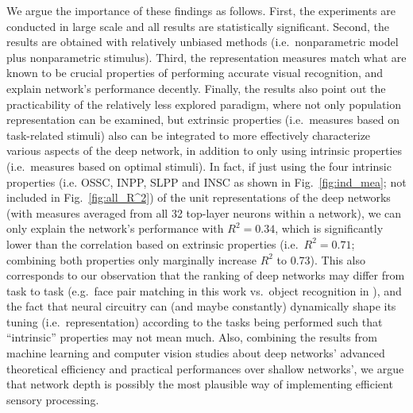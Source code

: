 We argue the importance of these findings as follows. First, the experiments are conducted in large scale and all results are statistically significant. Second, the results are obtained with relatively unbiased methods (i.e.~nonparametric model plus nonparametric stimulus). Third, the representation measures match what are known to be crucial properties of performing accurate visual recognition, and explain network's performance decently. Finally, the results also point out the practicability of the relatively less explored paradigm, where not only population representation can be examined, but extrinsic properties (i.e.~measures based on task-related stimuli) also can be integrated to more effectively characterize various aspects of the deep network, in addition to only using intrinsic properties (i.e.~measures based on optimal stimuli). In fact, if just using the four intrinsic properties (i.e. OSSC, INPP, SLPP and INSC as shown in Fig.~\ref{fig:ind_mea}; not included in Fig.~\ref{fig:all_R^2}) of the unit representations of the deep networks (with measures averaged from all 32 top-layer neurons within a network), we can only explain the network's performance with $R^2 = 0.34$, which is significantly lower than the correlation based on extrinsic properties (i.e.~$R^2 = 0.71$; combining both properties only marginally increase $R^2$ to 0.73). This also corresponds to our observation that the ranking of deep networks may differ from task to task (e.g.~face pair matching in this work vs.~object recognition in \cite{pinto2009high}), and the fact that neural circuitry can (and maybe constantly) dynamically shape its tuning (i.e.~representation) according to the tasks being performed \cite{gilbert2007brain} such that ``intrinsic'' properties may not mean much. Also, combining the results from machine learning and computer vision studies about deep networks' advanced theoretical efficiency \cite{delalleau2011shallow, montufar2014number} and practical performances over shallow networks', we argue that network depth is possibly the most plausible way of implementing efficient sensory processing.



